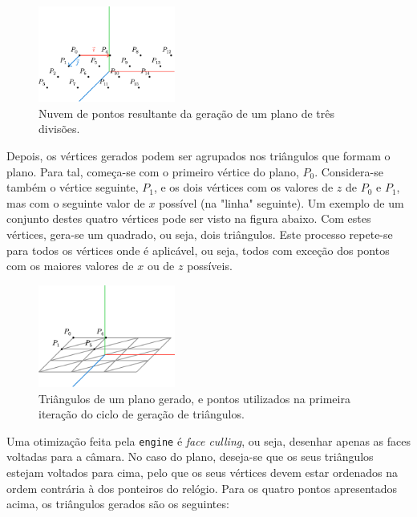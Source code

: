 \documentclass[12pt, a4paper]{article}
\begin{document}
\begin{figure}[H]
    \centering
    \includegraphics[width=0.4\textwidth]{res/phase1/figures/PlanePoints.pdf}
    \caption{Nuvem de pontos resultante da geração de um plano de três divisões.}
\end{figure}

Depois, os vértices gerados podem ser agrupados nos triângulos que formam o plano. Para tal,
começa-se com o primeiro vértice do plano, $P_0$. Considera-se também o vértice seguinte, $P_1$, e
os dois vértices com os valores de $z$ de $P_0$ e $P_1$, mas com o seguinte valor de $x$ possível
(na "linha"{} seguinte). Um exemplo de um conjunto destes quatro vértices pode ser visto na figura
abaixo. Com estes vértices, gera-se um quadrado, ou seja, dois triângulos. Este processo repete-se
para todos os vértices onde é aplicável, ou seja, todos com exceção dos pontos com os maiores
valores de $x$ ou de $z$ possíveis.

\begin{figure}[H]
    \centering
    \includegraphics[width=0.4\textwidth]{res/phase1/figures/PlaneTriangles.pdf}
    \caption{
        \onehalfspacing
        Triângulos de um plano gerado, e pontos utilizados na primeira iteração do ciclo de geração
        de triângulos.
    }
\end{figure}

Uma otimização feita pela \texttt{engine} é \emph{face culling}, ou seja, desenhar apenas as faces
voltadas para a câmara. No caso do plano, deseja-se que os seus triângulos estejam voltados para
cima, pelo que os seus vértices devem estar ordenados na ordem contrária à dos ponteiros do
relógio. Para os quatro pontos apresentados acima, os triângulos gerados são os seguintes:
\end{document}
